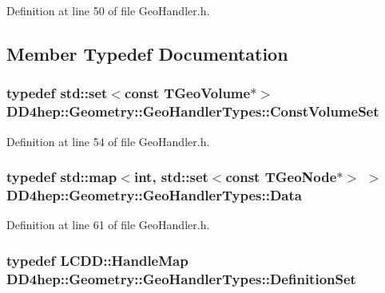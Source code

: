 Definition at line 50 of file GeoHandler.h.

\subsection{Member Typedef Documentation}
\hypertarget{class_d_d4hep_1_1_geometry_1_1_geo_handler_types_ae294545274767eb8cf886a303033b351}{
\subsubsection[{ConstVolumeSet}]{\setlength{\rightskip}{0pt plus 5cm}typedef std::set$<$const TGeoVolume$\ast$$>$ {\bf DD4hep::Geometry::GeoHandlerTypes::ConstVolumeSet}}}
\label{class_d_d4hep_1_1_geometry_1_1_geo_handler_types_ae294545274767eb8cf886a303033b351}


Definition at line 54 of file GeoHandler.h.\hypertarget{class_d_d4hep_1_1_geometry_1_1_geo_handler_types_a568935b7e878d3ea9fe97a2ecf33d641}{
\subsubsection[{Data}]{\setlength{\rightskip}{0pt plus 5cm}typedef std::map$<$int, std::set$<$const TGeoNode$\ast$$>$ $>$ {\bf DD4hep::Geometry::GeoHandlerTypes::Data}}}
\label{class_d_d4hep_1_1_geometry_1_1_geo_handler_types_a568935b7e878d3ea9fe97a2ecf33d641}


Definition at line 61 of file GeoHandler.h.\hypertarget{class_d_d4hep_1_1_geometry_1_1_geo_handler_types_a960cd930e1a491fc9a6afa5058865b4e}{
\subsubsection[{DefinitionSet}]{\setlength{\rightskip}{0pt plus 5cm}typedef {\bf LCDD::HandleMap} {\bf DD4hep::Geometry::GeoHandlerTypes::DefinitionSet}}}
\label{class_d_d4hep_1_1_geometry_1_1_geo_handler_types_a960cd930e1a491fc9a6afa5058865b4e}


